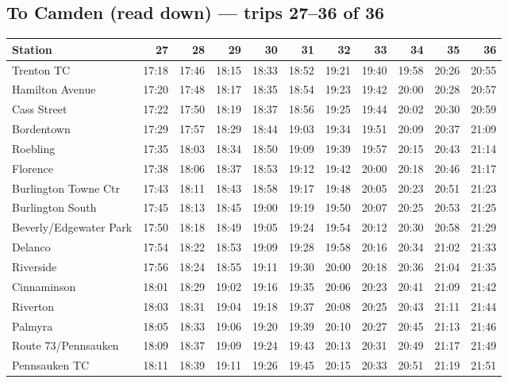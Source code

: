 \subsection*{To Camden (read down) --- trips 27--36 of 36}
\begin{center}\footnotesize\setlength{\tabcolsep}{3pt}\begin{tabular}{@{}lrrrrrrrrrr@{}}\toprule
Station & 27 & 28 & 29 & 30 & 31 & 32 & 33 & 34 & 35 & 36 \\\midrule
Trenton TC & 17:18 & 17:46 & 18:15 & 18:33 & 18:52 & 19:21 & 19:40 & 19:58 & 20:26 & 20:55 \\
Hamilton Avenue & 17:20 & 17:48 & 18:17 & 18:35 & 18:54 & 19:23 & 19:42 & 20:00 & 20:28 & 20:57 \\
Cass Street & 17:22 & 17:50 & 18:19 & 18:37 & 18:56 & 19:25 & 19:44 & 20:02 & 20:30 & 20:59 \\
Bordentown & 17:29 & 17:57 & 18:29 & 18:44 & 19:03 & 19:34 & 19:51 & 20:09 & 20:37 & 21:09 \\
Roebling & 17:35 & 18:03 & 18:34 & 18:50 & 19:09 & 19:39 & 19:57 & 20:15 & 20:43 & 21:14 \\
Florence & 17:38 & 18:06 & 18:37 & 18:53 & 19:12 & 19:42 & 20:00 & 20:18 & 20:46 & 21:17 \\
Burlington Towne Ctr & 17:43 & 18:11 & 18:43 & 18:58 & 19:17 & 19:48 & 20:05 & 20:23 & 20:51 & 21:23 \\
Burlington South & 17:45 & 18:13 & 18:45 & 19:00 & 19:19 & 19:50 & 20:07 & 20:25 & 20:53 & 21:25 \\
Beverly/Edgewater Park & 17:50 & 18:18 & 18:49 & 19:05 & 19:24 & 19:54 & 20:12 & 20:30 & 20:58 & 21:29 \\
Delanco & 17:54 & 18:22 & 18:53 & 19:09 & 19:28 & 19:58 & 20:16 & 20:34 & 21:02 & 21:33 \\
Riverside & 17:56 & 18:24 & 18:55 & 19:11 & 19:30 & 20:00 & 20:18 & 20:36 & 21:04 & 21:35 \\
Cinnaminson & 18:01 & 18:29 & 19:02 & 19:16 & 19:35 & 20:06 & 20:23 & 20:41 & 21:09 & 21:42 \\
Riverton & 18:03 & 18:31 & 19:04 & 19:18 & 19:37 & 20:08 & 20:25 & 20:43 & 21:11 & 21:44 \\
Palmyra & 18:05 & 18:33 & 19:06 & 19:20 & 19:39 & 20:10 & 20:27 & 20:45 & 21:13 & 21:46 \\
Route 73/Pennsauken & 18:09 & 18:37 & 19:09 & 19:24 & 19:43 & 20:13 & 20:31 & 20:49 & 21:17 & 21:49 \\
Pennsauken TC & 18:11 & 18:39 & 19:11 & 19:26 & 19:45 & 20:15 & 20:33 & 20:51 & 21:19 & 21:51 \\

\end{tabular}
\end{center}
